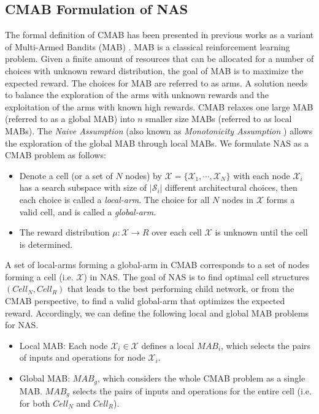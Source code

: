 \documentclass[conference]{IEEEtran}
\def \S  {\mathcal{S}}
\def \X {\mathcal{X}}
\begin{document}
\subsection{CMAB Formulation of NAS}
\label{sec:problem_formulation}
The formal definition of CMAB has been presented in previous works as a variant of Multi-Armed Bandits (MAB) \cite{chen2013combinatorial, ontanon2013combinatorial}. MAB is a classical reinforcement learning problem. Given a finite amount of resources that can be allocated for a number of choices with unknown reward distribution, 
the goal of MAB is to maximize the expected reward. 
The choices for MAB are referred to as arms. 
A solution needs to balance the exploration of the arms with unknown rewards and the exploitation of the arms with known high rewards. 
CMAB relaxes one large MAB (referred to as a global MAB) into $n$ smaller size MABs (referred to as local MABs). 
The \textit{Naive Assumption} \cite{ontanon2013combinatorial} (also known as \textit{Monotonicity Assumption} \cite{chen2013combinatorial}) allows the exploration of the global MAB through local MABs. We formulate NAS as a CMAB problem as follows:
\begin{itemize}
    \item Denote a cell (or a set of $N$ nodes) by $\X = \{\X_1, \cdots, \X_{N}\}$ with each node $\X_i$ has a search subspace with size of $|\S_i|$ different architectural choices, then each choice is called a \emph{local-arm}. The choice for all $N$ nodes in $\X$ forms a valid cell, and is called a \emph{global-arm}.
    \item The reward distribution $\mu:\X \rightarrow R$ over each cell $\X$ is unknown until the cell is determined.
\end{itemize}
A set of local-arms forming a global-arm in CMAB corresponds to a set of nodes forming a cell (i.e. $\X$) in NAS. 
The goal of NAS is to find optimal cell structures $(Cell_N, Cell_R)$ that leads to the best performing child network, or from the CMAB perspective, to find a valid global-arm that optimizes the expected reward. 
Accordingly, we can define the following local and global MAB problems for NAS.
\begin{itemize}
    \item Local MAB: Each node $\X_i \in \X$ defines a local $MAB_i$, which selects the pairs of inputs and operations for node $\X_i$.
    \item Global MAB: $MAB_g$, which considers the whole CMAB problem as a single MAB. $MAB_g$ selects the pairs of inputs and operations for the entire cell (i.e. for both $Cell_N$ and $Cell_R$).
\end{itemize}
\end{document}
